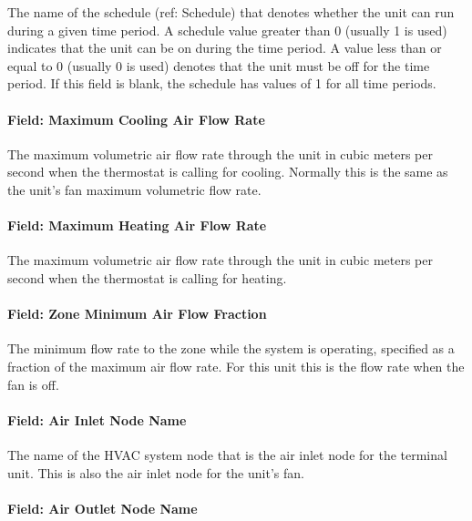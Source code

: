 The name of the schedule (ref: Schedule) that denotes whether the unit can run during a given time period. A schedule value greater than 0 (usually 1 is used) indicates that the unit can be on during the time period. A value less than or equal to 0 (usually 0 is used) denotes that the unit must be off for the time period. If this field is blank, the schedule has values of 1 for all time periods.

\paragraph{Field: Maximum Cooling Air Flow Rate}\label{field-maximum-cooling-air-flow-rate}

The maximum volumetric air flow rate through the unit in cubic meters per second when the thermostat is calling for cooling. Normally this is the same as the unit's fan maximum volumetric flow rate.

\paragraph{Field: Maximum Heating Air Flow Rate}\label{field-maximum-heating-air-flow-rate}

The maximum volumetric air flow rate through the unit in cubic meters per second when the thermostat is calling for heating.

\paragraph{Field: Zone Minimum Air Flow Fraction}\label{field-zone-minimum-air-flow-fraction}

The minimum flow rate to the zone while the system is operating, specified as a fraction of the maximum air flow rate. For this unit this is the flow rate when the fan is off.

\paragraph{Field: Air Inlet Node Name}\label{field-air-inlet-node-name-2}

The name of the HVAC system node that is the air inlet node for the terminal unit. This is also the air inlet node for the unit's fan.

\paragraph{Field: Air Outlet Node Name}\label{field-air-outlet-node-name-2}

